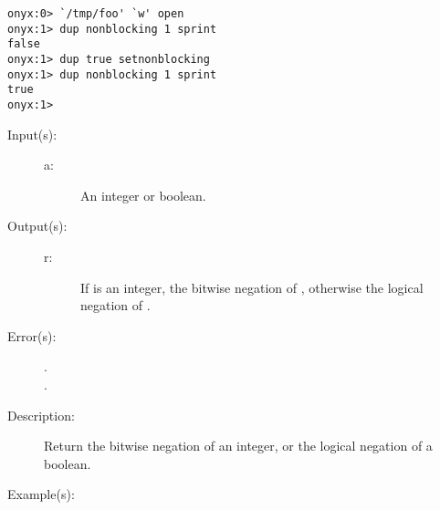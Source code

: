 \begin{description}
\begin{description}
\begin{verbatim}
onyx:0> `/tmp/foo' `w' open
onyx:1> dup nonblocking 1 sprint
false
onyx:1> dup true setnonblocking
onyx:1> dup nonblocking 1 sprint
true
onyx:1>
		\end{verbatim}
	\end{description}
\label{systemdict:not}
\item[{\onyxop{a}{not}{r}}: ]
	\begin{description}\item[]
	\item[Input(s): ]
		\begin{description}\item[]
		\item[a: ]
			An integer or boolean.
		\end{description}
	\item[Output(s): ]
		\begin{description}\item[]
		\item[r: ]
			If  is an integer, the bitwise negation of
			, otherwise the logical negation of .
		\end{description}
	\item[Error(s): ]
		\begin{description}\item[]
		\item[.]
		\item[.]
		\end{description}
	\item[Description: ]
		Return the bitwise negation of an integer, or the logical
		negation of a boolean.
	\item[Example(s): ]\begin{verbatim}


\end{verbatim}
\end{description}
\end{description}
